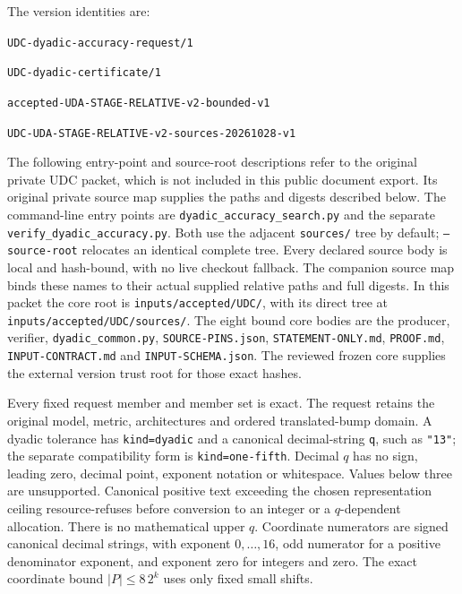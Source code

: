 The version identities are:
\begin{description}[leftmargin=1em,style=nextline,itemsep=0.1em]
\item[Request] \nolinkurl{UDC-dyadic-accuracy-request/1}
\item[Certificate] \nolinkurl{UDC-dyadic-certificate/1}
\item[Backend] \nolinkurl{accepted-UDA-STAGE-RELATIVE-v2-bounded-v1}
\item[Source bundle] \nolinkurl{UDC-UDA-STAGE-RELATIVE-v2-sources-20261028-v1}
\end{description}
The following entry-point and source-root descriptions refer to the original
private UDC packet, which is not included in this public document export.
Its original private source map supplies the paths and digests described below.
The command-line entry points are \nolinkurl{dyadic_accuracy_search.py} and
the separate \nolinkurl{verify_dyadic_accuracy.py}. Both use the adjacent \texttt{sources/}
tree by default; \texttt{--source-root} relocates an identical complete
tree. Every declared source body is local and hash-bound, with no live
checkout fallback. The companion source map binds these names to their
actual supplied relative paths and full digests.
In this packet the core root is \nolinkurl{inputs/accepted/UDC/}, with its
direct tree at \nolinkurl{inputs/accepted/UDC/sources/}. The eight bound core
bodies are the producer, verifier, \nolinkurl{dyadic_common.py},
\nolinkurl{SOURCE-PINS.json}, \nolinkurl{STATEMENT-ONLY.md},
\nolinkurl{PROOF.md}, \nolinkurl{INPUT-CONTRACT.md} and
\nolinkurl{INPUT-SCHEMA.json}. The reviewed frozen core supplies the external
version trust root for those exact hashes.

Every fixed request member and member set is exact. The request retains
the original model, metric, architectures and ordered translated-bump domain.
A dyadic tolerance has \texttt{kind=dyadic} and a canonical decimal-string
\texttt{q}, such as \texttt{"13"}; the separate compatibility form is
\texttt{kind=one-fifth}. Decimal $q$ has no sign, leading zero, decimal point,
exponent notation or whitespace. Values below three are unsupported.
Canonical positive text exceeding the chosen representation ceiling
resource-refuses before conversion to an integer or a $q$-dependent
allocation. There is no mathematical upper $q$. Coordinate numerators are
signed canonical decimal strings, with exponent $0,\ldots,16$, odd numerator
for a positive denominator exponent, and exponent zero for integers and zero.
The exact coordinate bound $|P|\le8\,2^k$ uses only fixed small shifts.


